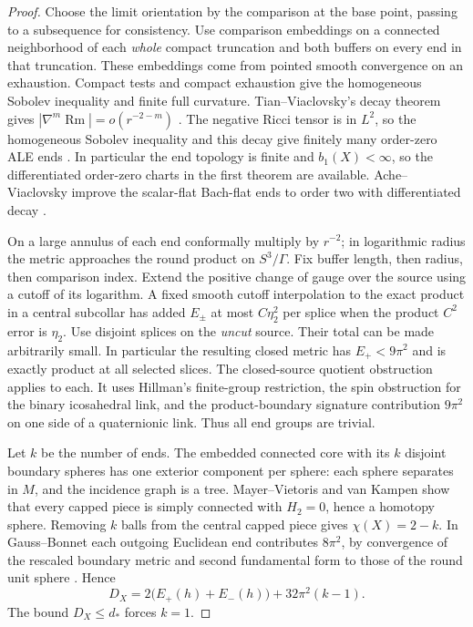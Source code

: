 \documentclass[11pt,letterpaper]{article}
\DeclareMathOperator{\Rm}{Rm}
\begin{document}
\begin{proof}
Choose the limit orientation by the comparison at the base point,
passing to a subsequence for consistency. Use comparison embeddings
on a connected neighborhood of each \emph{whole} compact truncation
and both buffers on every end in that truncation. These embeddings
come from pointed smooth convergence on an exhaustion. Compact tests
and compact exhaustion give the homogeneous Sobolev inequality and
finite full curvature. Tian--Viaclovsky's decay theorem gives
\(|\nabla^m\Rm|=o(r^{-2-m})\) \cite[Theorem 1.1, first part]{TianViaclovsky2005ALE}.
The negative Ricci tensor is in \(L^2\), so the homogeneous Sobolev
inequality and this decay give finitely many order-zero ALE ends
\cite[Theorem 1.1]{TianViaclovsky2008Volume}. In particular the
end topology is finite and \(b_1(X)<\infty\), so the differentiated
order-zero charts in the first theorem are available.
Ache--Viaclovsky improve the scalar-flat Bach-flat ends to order two
with differentiated decay \cite[Theorem 1.2]{AcheViaclovsky2011Obstruction}.

On a large annulus of each end conformally multiply by \(r^{-2}\);
in logarithmic radius the metric approaches the round product on
\(S^3/\Gamma\). Fix buffer length, then radius, then comparison index.
Extend the positive change of gauge over the source using a cutoff
of its logarithm. A fixed smooth cutoff interpolation to the exact
product in a central subcollar has added \(E_\pm\) at most \(C\eta_2^2\)
per splice when the product \(C^2\) error is \(\eta_2\).
Use disjoint splices on the \emph{uncut} source. Their total can be
made arbitrarily small. In particular the resulting closed metric
has \(E_+<9\pi^2\) and is exactly product at all selected slices.
The closed-source quotient obstruction \cite[A quotient obstruction on the closed source]{Baker2026MarkedNecks}
applies to each. It uses Hillman's finite-group restriction, the spin
obstruction for the binary icosahedral link, and the product-boundary
signature contribution \(9\pi^2\) on one side of a quaternionic link.
Thus all end groups are trivial.

Let \(k\) be the number of ends. The embedded connected core with its
\(k\) disjoint boundary spheres has one exterior component per sphere:
each sphere separates in \(M\), and the incidence graph is a tree.
Mayer--Vietoris and van Kampen show that every capped piece is simply
connected with \(H_2=0\), hence a homotopy sphere. Removing \(k\) balls
from the central capped piece gives \(\chi(X)=2-k\). In Gauss--Bonnet
each outgoing Euclidean end contributes \(8\pi^2\), by convergence of
the rescaled boundary metric and second fundamental form to those of
the round unit sphere \cite[\S7]{TianViaclovsky2005ALE}. Hence
\[
 D_X=2\big(E_+(h)+E_-(h)\big)+32\pi^2(k-1).
\]
The bound \(D_X\le d_*\) forces \(k=1\).


\end{proof}
\end{document}
